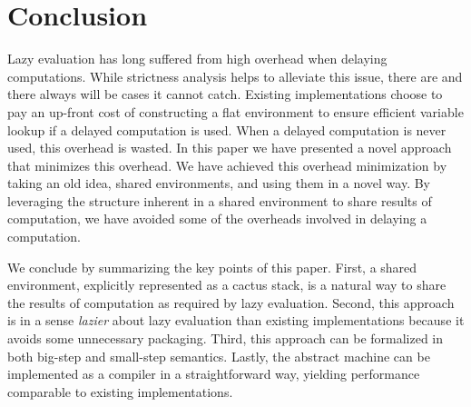 \section{Conclusion} \label{sec:conc}

Lazy evaluation has long suffered from high overhead when delaying computations.
While strictness analysis helps to alleviate this issue, there are and there
always will be cases it cannot catch. Existing implementations choose to pay an
up-front cost of constructing a flat environment to ensure efficient variable
lookup if a delayed computation is used. When a delayed computation is never
used, this overhead is wasted. In this paper we have presented a novel approach
that minimizes this overhead. We have achieved this overhead minimization by
taking an old idea, shared environments, and using them in a novel way. By
leveraging the structure inherent in a shared environment to share results of
computation, we have avoided some of the overheads involved in delaying a
computation. 

We conclude by summarizing the key points of this paper. First, a shared
environment, explicitly represented as a cactus stack, is a natural way to share
the results of computation as required by lazy evaluation. Second, this approach
is in a sense \emph{lazier} about lazy evaluation than existing implementations
because it avoids some unnecessary packaging. Third, this approach can be
formalized in both big-step and small-step semantics. Lastly, the abstract
machine can be implemented as a compiler in a straightforward way, yielding
performance comparable to existing implementations. 

